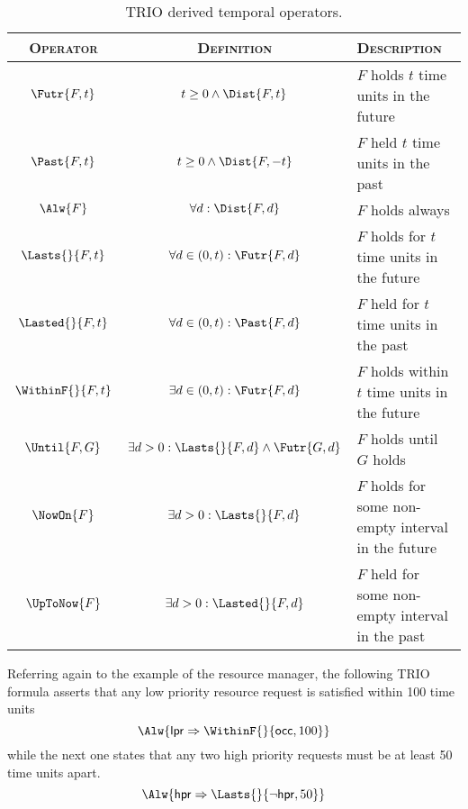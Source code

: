 \begin{table}[tbh]
\begin{center}
  \begin{scriptsize}
\begin{tabular}{|c|c|p{4.8cm}|}
    \hline
    \textsc{Operator}        &  \textsc{Definition}  &   \textsc{Description}\\
    \hline
    $\Futr{F,t}$             &  $t \geq 0 \wedge \Dist{F,t}$   &   $F$ holds $t$ time units in the future \\
    $\Past{F,t}$             &  $t \geq 0 \wedge \Dist{F,-t}$  &   $F$ held $t$ time units in the past \\

    $\Alw{F}$                 &  $\forall d: \Dist{F,d}$       &   $F$ holds always \\

    $\Lasts{}{F,t}$            &  $\forall d \in (0,t): \Futr{F,d}$ &  $F$ holds for $t$ time units in the future \\
    $\Lasted{}{F,t}$           &  $\forall d \in (0,t): \Past{F,d}$ &  $F$ held for $t$ time units in the past \\

    $\WithinF{}{F,t}$          &  $\exists d \in (0,t): \Futr{F,d}$ &  $F$ holds within $t$ time units in the future \\

   $\Until{F,G}$            &  $\exists d > 0: \Lasts{}{F,d} \wedge \Futr{G,d}$  &  $F$ holds until $G$ holds \\ 

    $\NowOn{F}$             &  $\exists d > 0: \Lasts{}{F,d}$ &   $F$ holds for some non-empty interval in the future \\

   $\UpToNow{F}$             &  $\exists d > 0: \Lasted{}{F,d}$ &   $F$ held for some non-empty interval in the past \\
    \hline
  \end{tabular}
  \end{scriptsize}
\end{center}
\caption{TRIO derived temporal operators.}
\label{tab:trio-operators}
\end{table}

Referring again to the example of the resource manager, the following 
TRIO formula asserts that any low priority resource request is 
satisfied within 100 time units 
\begin{equation*}
  \Alw{\mathsf{lpr} \Rightarrow \WithinF{}{\mathsf{occ}, 100}}
\end{equation*}
while the next one states that any two high priority requests 
must be at least 50 time units apart. 
\begin{equation*}
  \Alw{\mathsf{hpr} \Rightarrow \Lasts{}{\neg \mathsf{hpr}, 50}}
\end{equation*}

